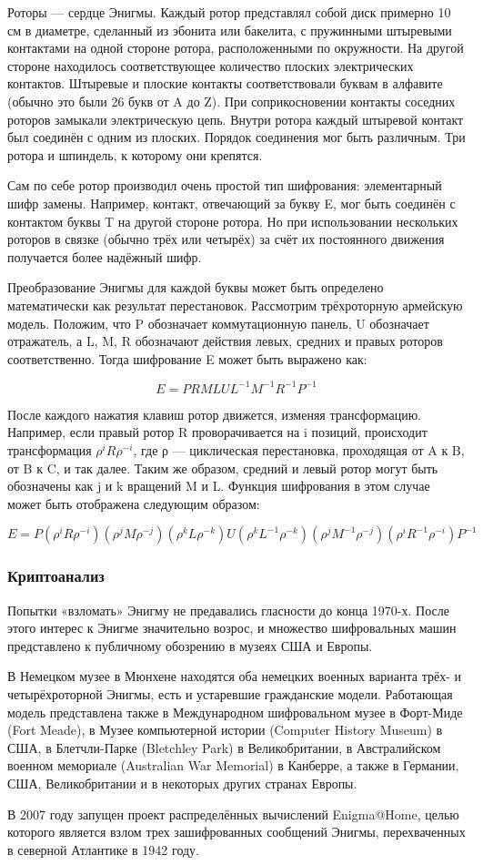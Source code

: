 Роторы — сердце Энигмы. Каждый ротор представлял собой диск примерно 10 см в диаметре, сделанный из эбонита или бакелита, с пружинными штыревыми контактами на одной стороне ротора, расположенными по окружности. На другой стороне находилось соответствующее количество плоских электрических контактов. Штыревые и плоские контакты соответствовали буквам в алфавите (обычно это были 26 букв от A до Z). При соприкосновении контакты соседних роторов замыкали электрическую цепь. Внутри ротора каждый штыревой контакт был соединён с одним из плоских. Порядок соединения мог быть различным.
Три ротора и шпиндель, к которому они крепятся.

Сам по себе ротор производил очень простой тип шифрования: элементарный шифр замены. Например, контакт, отвечающий за букву E, мог быть соединён с контактом буквы T на другой стороне ротора. Но при использовании нескольких роторов в связке (обычно трёх или четырёх) за счёт их постоянного движения получается более надёжный шифр.

Преобразование Энигмы для каждой буквы может быть определено математически как результат перестановок. Рассмотрим трёхроторную армейскую модель. Положим, что P обозначает коммутационную панель, U обозначает отражатель, а L, M, R обозначают действия левых, средних и правых роторов соответственно. Тогда шифрование E может быть выражено как:

    $$E = PRMLUL^{-1}M^{-1}R^{-1}P^{-1}$$

После каждого нажатия клавиш ротор движется, изменяя трансформацию. Например, если правый ротор R проворачивается на i позиций, происходит трансформация $\rho^iR\rho^{-i}$, где ρ — циклическая перестановка, проходящая от A к B, от B к C, и так далее. Таким же образом, средний и левый ротор могут быть обозначены как j и k вращений M и L. Функция шифрования в этом случае может быть отображена следующим образом:

    $$E = P(\rho^iR\rho^{-i})(\rho^{j}M\rho^{-j})(\rho^{k}L\rho^{-k})U(\rho^kL^{-1}\rho^{-k})(\rho^{j}M^{-1}\rho^{-j})(\rho^{i}R^{-1}\rho^{-i})P^{-1}$$

\subsubsection{Криптоанализ}
Попытки «взломать» Энигму не предавались гласности до конца 1970-х. После этого интерес к Энигме значительно возрос, и множество шифровальных машин представлено к публичному обозрению в музеях США и Европы.

В Немецком музее в Мюнхене находятся оба немецких военных варианта трёх- и четырёхроторной Энигмы, есть и устаревшие гражданские модели. Работающая модель представлена также в Международном шифровальном музее в Форт-Миде (Fort Meade), в Музее компьютерной истории (Computer History Museum) в США, в Блетчли-Парке (Bletchley Park) в Великобритании, в Австралийском военном мемориале (Australian War Memorial) в Канберре, а также в Германии, США, Великобритании и в некоторых других странах Европы.

В 2007 году запущен проект распределённых вычислений Enigma@Home, целью которого является взлом трех зашифрованных сообщений Энигмы, перехваченных в северной Атлантике в 1942 году.
